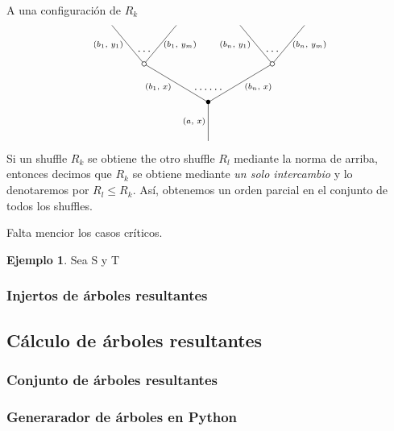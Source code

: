 \documentclass[11pt,a4paper,openright,oneside]{article}
\numberwithin{equation}{section}
\theoremstyle{definition}
\newtheorem{ex}[teo]{Ejemplo}
\begin{document}
A una configuraci\'on de $R_k$
\begin{equation}
    \xy
    <0.08cm, 0cm>:
    (0.0, 0.0)*{}="1"; %
    (0.0, 15.0)*=0{\bullet}="2"; %
    (-25.0, 30.0)*\cir<2pt>{}="3"; %
    (-37.5, 45.0)*{}="4"; %
    (-12.5, 45.0)*{}="5"; %
    (25.0, 30.0)*\cir<2pt>{}="6"; %
    (12.5, 45.0)*{}="7"; %
    (37.5, 45.0)*{}="8"; %
    "1";"2" **\dir{-};
    "2";"3" **\dir{-};
    "3";"4" **\dir{-};
    "3";"5" **\dir{-};
    "2";"6" **\dir{-};
    "6";"7" **\dir{-};
    "6";"8" **\dir{-};
    (-5.5, 7.5)*=0{\scriptstyle (a,\text{ }x)};
    (-19.5, 21)*=0{\scriptstyle (b_1,\text{ }x)};
    (-39, 37.5)*=0{\scriptstyle (b_1,\text{ }y_1)};
    (-11, 37.5)*=0{\scriptstyle (b_1,\text{ }y_m)};
    (19.5, 21)*=0{\scriptstyle (b_n,\text{ }x)};
    (10.5, 37.5)*=0{\scriptstyle (b_n,\text{ }y_1)};
    (39.5, 37.5)*=0{\scriptstyle (b_n,\text{ }y_m)};
    (-25,35)*{\dots};
    (25,35)*{\dots};
    (0,20)*{\dots\dots};
    \endxy
\end{equation}
Si un shuffle $R_k$ se obtiene the otro shuffle $R_l$ mediante la norma de arriba, entonces decimos que $R_k$ se obtiene mediante \emph{un solo intercambio} y lo denotaremos por $R_l\le R_k$.
As\'i, obtenemos un orden parcial en el conjunto de todos los shuffles.

Falta mencior los casos cr\'iticos.
\begin{ex}
    Sea S y T
\end{ex}


\subsubsection{Injertos de \'arboles resultantes}
\subsection{C\'alculo de \'arboles resultantes}
\subsubsection{Conjunto de \'arboles resultantes}
\subsubsection{Generarador de \'arboles en Python}
\newpage

\end{document}

